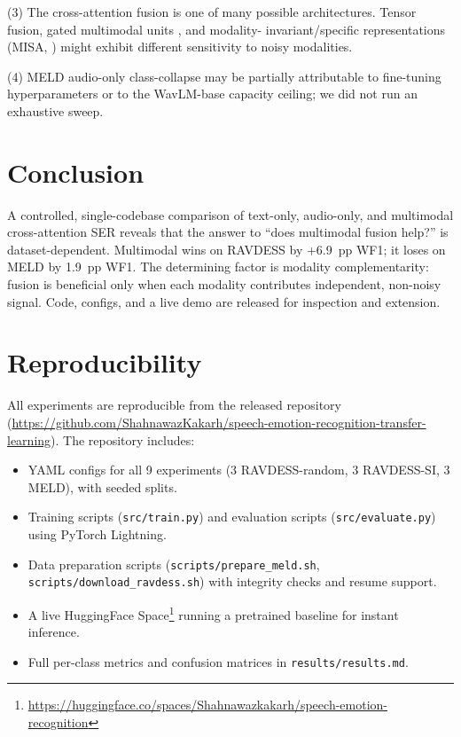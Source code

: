\documentclass[a4paper,10pt]{article}
\begin{document}
(3) The cross-attention fusion is one of many possible architectures.
Tensor fusion, gated multimodal units \cite{arevalo2017}, and modality-
invariant/specific representations (MISA, \cite{hazarika2020}) might
exhibit different sensitivity to noisy modalities.

(4) MELD audio-only class-collapse may be partially attributable to
fine-tuning hyperparameters or to the WavLM-base capacity ceiling; we did
not run an exhaustive sweep.

\section{Conclusion}

A controlled, single-codebase comparison of text-only, audio-only, and
multimodal cross-attention SER reveals that the answer to ``does
multimodal fusion help?'' is dataset-dependent. Multimodal wins on
RAVDESS by +6.9~pp WF1; it loses on MELD by 1.9~pp WF1. The determining
factor is modality complementarity: fusion is beneficial only when each
modality contributes independent, non-noisy signal. Code, configs, and a
live demo are released for inspection and extension.

\section*{Reproducibility}

All experiments are reproducible from the released repository
(\url{https://github.com/ShahnawazKakarh/speech-emotion-recognition-transfer-learning}).
The repository includes:

\begin{itemize}
\item YAML configs for all 9 experiments (3 RAVDESS-random, 3 RAVDESS-SI,
3 MELD), with seeded splits.
\item Training scripts (\texttt{src/train.py}) and evaluation scripts
(\texttt{src/evaluate.py}) using PyTorch Lightning.
\item Data preparation scripts (\texttt{scripts/prepare\_meld.sh},
\texttt{scripts/download\_ravdess.sh}) with integrity checks and resume
support.
\item A live HuggingFace Space\footnote{%
\url{https://huggingface.co/spaces/Shahnawazkakarh/speech-emotion-recognition}}
running a pretrained baseline for instant inference.
\item Full per-class metrics and confusion matrices in
\texttt{results/results.md}.
\end{itemize}
\end{document}

